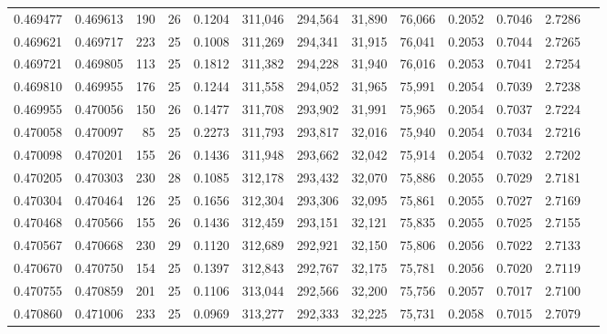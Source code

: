 \begin{tabular}{rrrrrrrrrrrrr}
0.469477 & 0.469613 & 190 &  26 &                                     0.1204 & 311,046 & 294,564 &  31,890 &  76,066 & 0.2052 & 0.7046 & 2.7286 \\
0.469621 & 0.469717 & 223 &  25 &                                     0.1008 & 311,269 & 294,341 &  31,915 &  76,041 & 0.2053 & 0.7044 & 2.7265 \\
0.469721 & 0.469805 & 113 &  25 &                                     0.1812 & 311,382 & 294,228 &  31,940 &  76,016 & 0.2053 & 0.7041 & 2.7254 \\
0.469810 & 0.469955 & 176 &  25 &                                     0.1244 & 311,558 & 294,052 &  31,965 &  75,991 & 0.2054 & 0.7039 & 2.7238 \\
0.469955 & 0.470056 & 150 &  26 &                                     0.1477 & 311,708 & 293,902 &  31,991 &  75,965 & 0.2054 & 0.7037 & 2.7224 \\
0.470058 & 0.470097 &  85 &  25 &                                     0.2273 & 311,793 & 293,817 &  32,016 &  75,940 & 0.2054 & 0.7034 & 2.7216 \\
0.470098 & 0.470201 & 155 &  26 &                                     0.1436 & 311,948 & 293,662 &  32,042 &  75,914 & 0.2054 & 0.7032 & 2.7202 \\
0.470205 & 0.470303 & 230 &  28 &                                     0.1085 & 312,178 & 293,432 &  32,070 &  75,886 & 0.2055 & 0.7029 & 2.7181 \\
0.470304 & 0.470464 & 126 &  25 &                                     0.1656 & 312,304 & 293,306 &  32,095 &  75,861 & 0.2055 & 0.7027 & 2.7169 \\
0.470468 & 0.470566 & 155 &  26 &                                     0.1436 & 312,459 & 293,151 &  32,121 &  75,835 & 0.2055 & 0.7025 & 2.7155 \\
0.470567 & 0.470668 & 230 &  29 &                                     0.1120 & 312,689 & 292,921 &  32,150 &  75,806 & 0.2056 & 0.7022 & 2.7133 \\
0.470670 & 0.470750 & 154 &  25 &                                     0.1397 & 312,843 & 292,767 &  32,175 &  75,781 & 0.2056 & 0.7020 & 2.7119 \\
0.470755 & 0.470859 & 201 &  25 &                                     0.1106 & 313,044 & 292,566 &  32,200 &  75,756 & 0.2057 & 0.7017 & 2.7100 \\
0.470860 & 0.471006 & 233 &  25 &                                     0.0969 & 313,277 & 292,333 &  32,225 &  75,731 & 0.2058 & 0.7015 & 2.7079 \\

\end{tabular}
